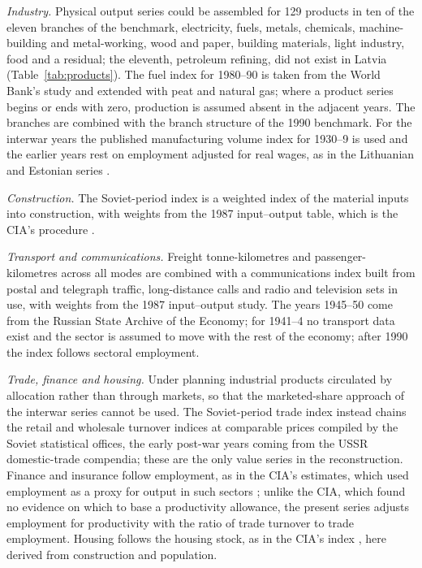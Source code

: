 \textit{Industry.} Physical output series could be assembled for 129 products in ten of the eleven branches of the benchmark, electricity, fuels, metals, chemicals, machine-building and metal-working, wood and paper, building materials, light industry, food and a residual; the eleventh, petroleum refining, did not exist in Latvia (Table~\ref{tab:products}). The fuel index for 1980--90 is taken from the World Bank's study and extended with peat and natural gas; where a product series begins or ends with zero, production is assumed absent in the adjacent years. The branches are combined with the branch structure of the 1990 benchmark. For the interwar years the published manufacturing volume index for 1930--9 is used and the earlier years rest on employment adjusted for real wages, as in the Lithuanian and Estonian series \parencite[39, 45]{ostlandinzahlen}.

\textit{Construction.} The Soviet-period index is a weighted index of the material inputs into construction, with weights from the 1987 input--output table, which is the CIA's procedure \parencite[66--89]{wbinputoutput1987}.

\textit{Transport and communications.} Freight tonne-kilometres and passenger-kilometres across all modes are combined with a communications index built from postal and telegraph traffic, long-distance calls and radio and television sets in use, with weights from the 1987 input--output study. The years 1945--50 come from the Russian State Archive of the Economy; for 1941--4 no transport data exist and the sector is assumed to move with the rest of the economy; after 1990 the index follows sectoral employment.

\textit{Trade, finance and housing.} Under planning industrial products circulated by allocation rather than through markets, so that the marketed-share approach of the interwar series cannot be used. The Soviet-period trade index instead chains the retail and wholesale turnover indices at comparable prices compiled by the Soviet statistical offices, the early post-war years coming from the USSR domestic-trade compendia; these are the only value series in the reconstruction. Finance and insurance follow employment, as in the CIA's estimates, which used employment as a proxy for output in such sectors \parencites[319]{Maddison1998b}[49]{cia1982a}; unlike the CIA, which found no evidence on which to base a productivity allowance, the present series adjusts employment for productivity with the ratio of trade turnover to trade employment. Housing follows the housing stock, as in the CIA's index \parencite[46]{cia1982a}, here derived from construction and population.


